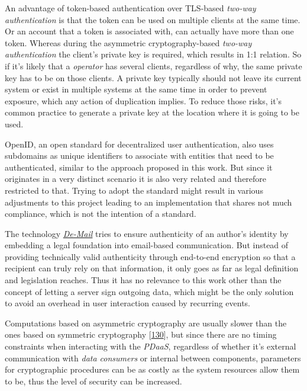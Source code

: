 \documentclass[12pt,english,a4paper,titlepage,cleardoublepage=empty,dottedtoc]{report}
\begin{document}
An advantage of token-based authentication over TLS-based \emph{two-way
authentication} is that the token can be used on multiple clients at the
same time. Or an account that a token is associated with, can actually
have more than one token. Whereas during the asymmetric
cryptography-based \emph{two-way authentication} the client's private
key is required, which results in 1:1 relation. So if it's likely that a
\emph{operator} has several clients, regardless of why, the same private
key has to be on those clients. A private key typically should not leave
its current system or exist in multiple systems at the same time in
order to prevent exposure, which any action of duplication implies. To
reduce those risks, it's common practice to generate a private key at
the location where it is going to be used.

OpenID, an open standard for decentralized user authentication, also
uses subdomains as unique identifiers to associate with entities that
need to be authenticated, similar to the approach proposed in this work.
But since it originates in a very distinct scenario it is also very
related and therefore restricted to that. Trying to adopt the standard
might result in various adjustments to this project leading to an
implementation that shares not much compliance, which is not the
intention of a standard.

The technology \emph{\protect\hyperlink{def--de-mail}{De-Mail}} tries to
ensure authenticity of an author's identity by embedding a legal
foundation into email-based communication. But instead of providing
technically valid authenticity through end-to-end encryption so that a
recipient can truly rely on that information, it only goes as far as
legal definition and legislation reaches. Thus it has no relevance to
this work other than the concept of letting a server sign outgoing data,
which might be the only solution to avoid an overhead in user
interaction caused by recurring events.

Computations based on asymmetric cryptography are usually slower than
the ones based on symmetric cryptography
{[}\protect\hyperlink{ref-book_2014_chapter-10-5-asym-random-number-gen}{130}{]},
but since there are no timing constraints when interacting with the
\emph{PDaaS}, regardless of whether it's external communication with
\emph{data consumers} or internal between components, parameters for
cryptographic procedures can be as costly as the system resources allow
them to be, thus the level of security can be increased.
\end{document}

